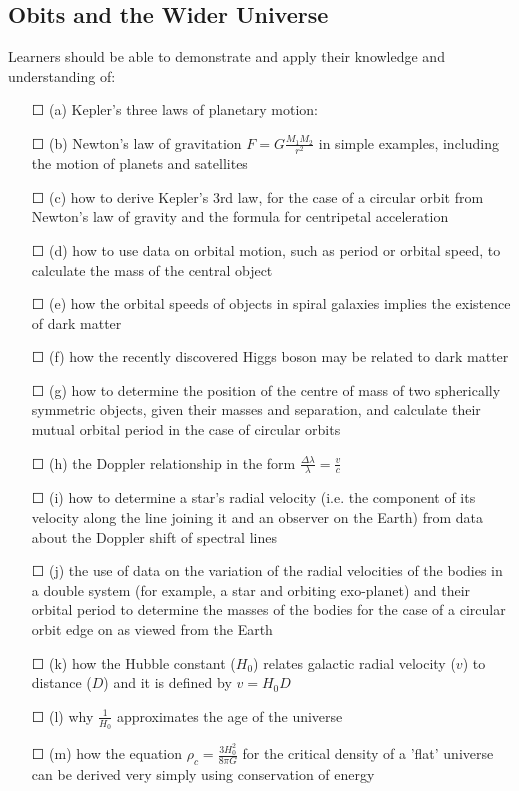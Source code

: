 \subsection{Obits and the Wider Universe}Learners should be able to demonstrate and apply their knowledge and
understanding of:
\begin{itemize}
	\item[\Large{$\Square$}] (a) Kepler's three laws of planetary motion:  
	\item[\Large{$\Square$}]		(b) Newton's law of gravitation \( F=G\frac{M_{1}M_{2}}{r^2} \) in simple examples, including the	motion of planets and satellites
	\item[\Large{$\Square$}]		(c) how to derive Kepler's 3rd law, for the case of a circular orbit from Newton's law of gravity and the formula for centripetal acceleration
	\item[\Large{$\Square$}]		(d) how to use data on orbital motion, such as period or orbital speed, to calculate the mass of the central object
	\item[\Large{$\Square$}]		(e) how the orbital speeds of objects in spiral galaxies implies the existence of dark matter
	\item[\Large{$\Square$}]		(f) how the recently discovered Higgs boson may be related to dark matter
	\item[\Large{$\Square$}]		(g) how to determine the position of the centre of mass of two spherically	symmetric objects, given their masses and separation, and \sq calculate their mutual orbital period in the case of circular orbits
	\item[\Large{$\Square$}]		(h) the Doppler relationship in the form \( \frac{\Delta \lambda}{\lambda}=\frac{v}{c} \)
	\item[\Large{$\Square$}]		(i) how to determine a star's radial velocity (i.e. the component of its velocity along the line joining it and an observer on the Earth) from data about the Doppler shift of spectral lines
	\item[\Large{$\Square$}]		(j) the use of data on the variation of the radial velocities of the bodies in a	double system (for example, a star and orbiting exo-planet) and their orbital period to determine the masses of the bodies for the case of a circular orbit edge on as viewed from the Earth
	\item[\Large{$\Square$}]		(k) how the Hubble constant ($H_0$) relates galactic radial velocity ($v$) to distance ($D$) and it is defined by $v= H_{0}D$
	\item[\Large{$\Square$}]		(l) why \(\frac{1}{H_0}\) approximates the age of the universe
	\item[\Large{$\Square$}] (m) how the equation \( \rho_{c} = \frac{3H_{0}^{2}}{8\pi G} \) for the critical density of a 'flat' universe can be derived very simply using conservation of energy
\end{itemize}

